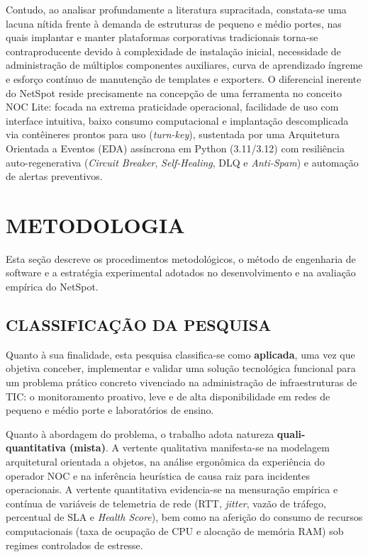 \documentclass[12pt,a4paper]{article}
\begin{document}
Contudo, ao analisar profundamente a literatura supracitada, constata-se uma lacuna nítida frente à demanda de estruturas de pequeno e médio portes, nas quais implantar e manter plataformas corporativas tradicionais torna-se contraproducente devido à complexidade de instalação inicial, necessidade de administração de múltiplos componentes auxiliares, curva de aprendizado íngreme e esforço contínuo de manutenção de templates e exporters. O diferencial inerente do NetSpot reside precisamente na concepção de uma ferramenta no conceito NOC Lite: focada na extrema praticidade operacional, facilidade de uso com interface intuitiva, baixo consumo computacional e implantação descomplicada via contêineres prontos para uso (\textit{turn-key}), sustentada por uma Arquitetura Orientada a Eventos (EDA) assíncrona em Python (3.11/3.12) com resiliência auto-regenerativa (\textit{Circuit Breaker}, \textit{Self-Healing}, DLQ e \textit{Anti-Spam}) e automação de alertas preventivos.

\section{METODOLOGIA}
Esta seção descreve os procedimentos metodológicos, o método de engenharia de software e a estratégia experimental adotados no desenvolvimento e na avaliação empírica do NetSpot.

\subsection{CLASSIFICAÇÃO DA PESQUISA}
Quanto à sua finalidade, esta pesquisa classifica-se como \textbf{aplicada}, uma vez que objetiva conceber, implementar e validar uma solução tecnológica funcional para um problema prático concreto vivenciado na administração de infraestruturas de TIC: o monitoramento proativo, leve e de alta disponibilidade em redes de pequeno e médio porte e laboratórios de ensino.

Quanto à abordagem do problema, o trabalho adota natureza \textbf{quali-quantitativa (mista)}. A vertente qualitativa manifesta-se na modelagem arquitetural orientada a objetos, na análise ergonômica da experiência do operador NOC e na inferência heurística de causa raiz para incidentes operacionais. A vertente quantitativa evidencia-se na mensuração empírica e contínua de variáveis de telemetria de rede (RTT, \textit{jitter}, vazão de tráfego, percentual de SLA e \textit{Health Score}), bem como na aferição do consumo de recursos computacionais (taxa de ocupação de CPU e alocação de memória RAM) sob regimes controlados de estresse.
\end{document}
